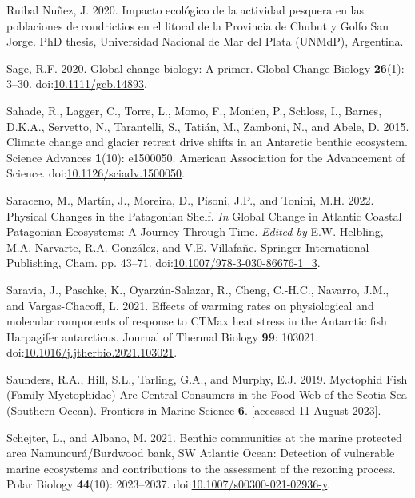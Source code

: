 \documentclass[
]{article}
\newlength{\cslhangindent}
\newenvironment{CSLReferences}[2] %
 {\begin{list}{}{%
  \setlength{\itemindent}{0pt}
  \setlength{\leftmargin}{0pt}
  \setlength{\parsep}{0pt}
  \ifodd #1
   \setlength{\leftmargin}{\cslhangindent}
   \setlength{\itemindent}{-1\cslhangindent}
  \fi
  \setlength{\itemsep}{#2\baselineskip}}}
 {\end{list}}
\begin{document}
\begin{CSLReferences}{1}{0}
Ruibal Nuñez, J. 2020. {Impacto ecol{ó}gico de la actividad pesquera en
las poblaciones de condrictios en el litoral de la Provincia de Chubut y
Golfo San Jorge}. PhD thesis, Universidad Nacional de Mar del Plata
(UNMdP), Argentina.

Sage, R.F. 2020. Global change biology: {A} primer. Global Change
Biology \textbf{26}(1): 3--30.
doi:\href{https://doi.org/10.1111/gcb.14893}{10.1111/gcb.14893}.

Sahade, R., Lagger, C., Torre, L., Momo, F., Monien, P., Schloss, I.,
Barnes, D.K.A., Servetto, N., Tarantelli, S., Tatián, M., Zamboni, N.,
and Abele, D. 2015. Climate change and glacier retreat drive shifts in
an {Antarctic} benthic ecosystem. Science Advances \textbf{1}(10):
e1500050. American Association for the Advancement of Science.
doi:\href{https://doi.org/10.1126/sciadv.1500050}{10.1126/sciadv.1500050}.

Saraceno, M., Martín, J., Moreira, D., Pisoni, J.P., and Tonini, M.H.
2022. Physical {Changes} in the {Patagonian Shelf}. \emph{In} Global
{Change} in {Atlantic Coastal Patagonian Ecosystems}: {A Journey Through
Time}. \emph{Edited by} E.W. Helbling, M.A. Narvarte, R.A. González, and
V.E. Villafañe. Springer International Publishing, Cham. pp. 43--71.
doi:\href{https://doi.org/10.1007/978-3-030-86676-1_3}{10.1007/978-3-030-86676-1\_3}.

Saravia, J., Paschke, K., Oyarzún-Salazar, R., Cheng, C.-H.C., Navarro,
J.M., and Vargas-Chacoff, L. 2021. Effects of warming rates on
physiological and molecular components of response to {CTMax} heat
stress in the {Antarctic} fish {Harpagifer} antarcticus. Journal of
Thermal Biology \textbf{99}: 103021.
doi:\href{https://doi.org/10.1016/j.jtherbio.2021.103021}{10.1016/j.jtherbio.2021.103021}.

Saunders, R.A., Hill, S.L., Tarling, G.A., and Murphy, E.J. 2019.
Myctophid {Fish} ({Family Myctophidae}) {Are Central Consumers} in the
{Food Web} of the {Scotia Sea} ({Southern Ocean}). Frontiers in Marine
Science \textbf{6}. {[}accessed 11 August 2023{]}.

Schejter, L., and Albano, M. 2021. Benthic communities at the marine
protected area {Namuncur{á}}/{Burdwood} bank, {SW Atlantic Ocean}:
Detection of vulnerable marine ecosystems and contributions to the
assessment of the rezoning process. Polar Biology \textbf{44}(10):
2023--2037.
doi:\href{https://doi.org/10.1007/s00300-021-02936-y}{10.1007/s00300-021-02936-y}.


\end{CSLReferences}
\end{document}

